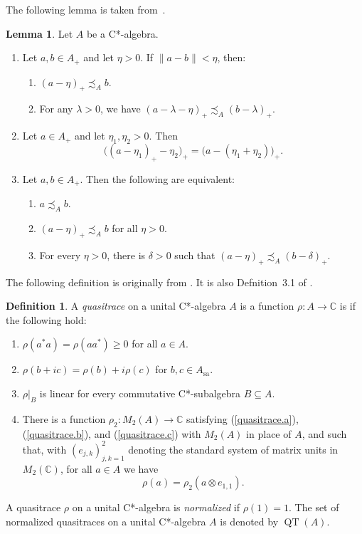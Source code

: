 \documentclass[10pt]{amsart}
\numberwithin{equation}{section}
\theoremstyle{definition}
\newtheorem{lem}[thm]{Lemma}
\newtheorem{dfn}[thm]{Definition}
\newcommand{\dt}{\delta}
\newcommand{\ld}{\lambda}
\newcommand{\QT}{{\operatorname{QT}}}
\newcommand{\tfae}{the following are equivalent}
\newcommand{\ca}{C*-algebra}
\begin{document}
The following lemma is taken from~\cite{KR00, Ph14, Ror92}.
%
\begin{lem}\label{PhiB.Lem_18_4}
Let $A$ be a \ca.
%
\begin{enumerate}
%
\item\label{PhiB.Lem_18_4_10}
Let $a, b \in A_{+}$ and let $\eta > 0$.
If $\| a - b \| < \eta$, then:
%
\begin{enumerate}
%
\item\label{PhiB.Lem_18_4_10.a}
$(a - \eta)_{+} \precsim_A b$.
\item\label{Item_9420_LgSb_1_6}
For any $\ld > 0$,
we have $(a - \ld - \eta)_{+} \precsim_A (b - \ld)_{+}$.
\end{enumerate}
%
\item\label{PhiB.Lem_18_4_8}
Let $a \in A_{+}$ and let $\eta_1, \eta_2 > 0$.
Then
\[
\big( ( a - \eta_1)_{+} - \eta_2 \big)_{+}
 = \big( a - ( \eta_1 + \eta_2 ) \big)_{+}.
\]
%
\item\label{PhiB.Lem_18_4_11}
Let $a, b \in A_{+}$.
Then \tfae:
%
\begin{enumerate}
%
\item\label{PhiB.Lem_18_4_11.a}
$a \precsim_A b$.
%
\item\label{PhiB.Lem_18_4_11.b}
$(a - \eta)_{+} \precsim_A b$ for all $\eta > 0$.
%
\item\label{PhiB.Lem_18_4_11.c}
For every $\eta > 0$, there is $\dt > 0$ such that
$(a - \eta)_{+} \precsim_A (b - \dt)_{+}$.
%
\end{enumerate}
%
\end{enumerate}
\end{lem}
%
The following definition is originally from \cite{BH82}.
It is also Defnition~3.1 of \cite{Hag14}.
\begin{dfn}\label{quasitrace}
A {\emph{quasitrace}} on a unital C*-algebra $A$ is
a function $\rho \colon A \to \mathbb{C}$
is  if the following hold:
\begin{enumerate}
\item\label{quasitrace.a}
$\rho (a^* a) = \rho (a a^*) \geq 0$ for all $a \in A$.
\item\label{quasitrace.b}
$\rho (b + i c ) = \rho (b) + i \rho ( c ) $
for $b, c \in A_{\mathrm{sa}}$.
\item\label{quasitrace.c}
$\rho |_B$ is linear
for every commutative C*-subalgebra $B \subseteq A$.
\item\label{quasitrace.d}
There is a function $\rho_2 \colon M_2 (A) \to \mathbb{C}$
satisfying
(\ref{quasitrace.a}), (\ref{quasitrace.b}), and (\ref{quasitrace.c})
with $M_2 (A)$ in place of $A$,
and such that,
with $(e_{j, k})_{j, k = 1}^{2}$
denoting the standard system of matrix units in $M_2 (\mathbb{C})$,
for all $a \in A$ we have
\[
\rho (a) = \rho_2 (a \otimes e_{1, 1}).
\]
\end{enumerate}
A quasitrace $\rho$ on a unital \ca{}
is {\emph{normalized}} if $\rho (1) = 1$.
The set of normalized quasitraces on a unital C*-algebra $A$ is denoted by $\QT (A)$.
\end{dfn}
%
\end{document}
